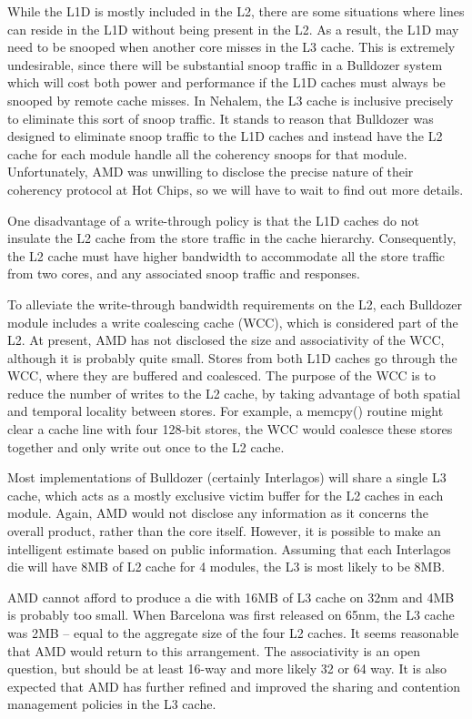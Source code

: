 		While the L1D is mostly included in the L2, there are some situations where lines can reside in the L1D without being present in the L2. As a result, the L1D may need to be snooped when another core misses in the L3 cache. This is extremely undesirable, since there will be substantial snoop traffic in a Bulldozer system which will cost both power and performance if the L1D caches must always be snooped by remote cache misses. In Nehalem, the L3 cache is inclusive precisely to eliminate this sort of snoop traffic. It stands to reason that Bulldozer was designed to eliminate snoop traffic to the L1D caches and instead have the L2 cache for each module handle all the coherency snoops for that module. Unfortunately, AMD was unwilling to disclose the precise nature of their coherency protocol at Hot Chips, so we will have to wait to find out more details.
		
		One disadvantage of a write-through policy is that the L1D caches do not insulate the L2 cache from the store traffic in the cache hierarchy. Consequently, the L2 cache must have higher bandwidth to accommodate all the store traffic from two cores, and any associated snoop traffic and responses.
		
		To alleviate the write-through bandwidth requirements on the L2, each Bulldozer module includes a write coalescing cache (WCC), which is considered part of the L2. At present, AMD has not disclosed the size and associativity of the WCC, although it is probably quite small. Stores from both L1D caches go through the WCC, where they are buffered and coalesced. The purpose of the WCC is to reduce the number of writes to the L2 cache, by taking advantage of both spatial and temporal locality between stores. For example, a memcpy() routine might clear a cache line with four 128-bit stores, the WCC would coalesce these stores together and only write out once to the L2 cache.
		
		Most implementations of Bulldozer (certainly Interlagos) will share a single L3 cache, which acts as a mostly exclusive victim buffer for the L2 caches in each module. Again, AMD would not disclose any information as it concerns the overall product, rather than the core itself. However, it is possible to make an intelligent estimate based on public information. Assuming that each Interlagos die will have 8MB of L2 cache for 4 modules, the L3 is most likely to be 8MB.
		
		AMD cannot afford to produce a die with 16MB of L3 cache on 32nm and 4MB is probably too small. When Barcelona was first released on 65nm, the L3 cache was 2MB – equal to the aggregate size of the four L2 caches. It seems reasonable that AMD would return to this arrangement. The associativity is an open question, but should be at least 16-way and more likely 32 or 64 way. It is also expected that AMD has further refined and improved the sharing and contention management policies in the L3 cache.
		
